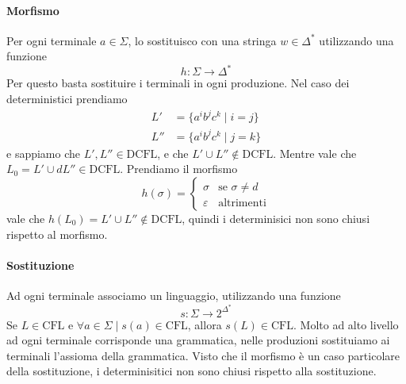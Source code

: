 \documentclass[12pt]{article}
\begin{document}
\paragraph{Morfismo} Per ogni terminale $a \in \Sigma$, lo sostituisco con una stringa $w \in \Delta^*$ utilizzando una funzione
$$ h : \Sigma \rightarrow \Delta^* $$
Per questo basta sostituire i terminali in ogni produzione.
Nel caso dei deterministici  prendiamo 
\begin{align*}
	L' &= \{ a^i b^j c^k \mid i = j \} \\
	L'' &= \{ a^i b^j c^k \mid j = k \} 
\end{align*}
e sappiamo che $L', L'' \in \text{DCFL}$, e che $L' \cup L'' \not \in \text{DCFL}$.
Mentre vale che $L_0 = L' \cup dL'' \in \text{DCFL}$.
Prendiamo il morfismo
$$ h(\sigma) = \begin{cases} \sigma & \text{se } \sigma \neq d \\ \varepsilon & \text{altrimenti} \end{cases} $$
vale che $h(L_0) = L' \cup L'' \not \in \text{DCFL}$, quindi i determinisici non sono chiusi rispetto al morfismo.

\paragraph{Sostituzione} Ad ogni terminale associamo un linguaggio, utilizzando una funzione
$$ s : \Sigma \rightarrow 2^{\Delta^*} $$
Se $L \in \text{CFL}$ e $\forall a \in \Sigma \mid s(a) \in \text{CFL}$, allora $s(L) \in \text{CFL}$.
Molto ad alto livello ad ogni terminale corrisponde una grammatica, nelle produzioni sostituiamo ai terminali l'assioma della grammatica.
Visto che il morfismo è un caso particolare della sostituzione, i determinisitici non sono chiusi rispetto alla sostituzione.
\end{document}
